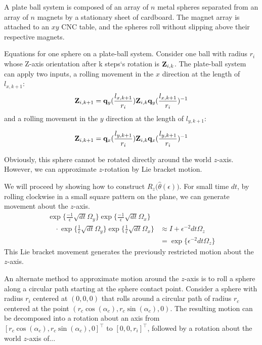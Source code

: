\documentclass[letter paper, 10pt, conference]{ieeeconf}
\begin{document}
A plate ball system is composed of an array of $n$ metal spheres separated from an array of $n$ magnets by a stationary sheet of cardboard.  The magnet array is attached to an $xy$ CNC table, and the spheres roll without slipping above their respective magnets.



Equations for one sphere on a plate-ball system.  Consider one ball with radius $r_i$ whose Z-axis orientation after k steps`s rotation is ${\bf Z}_{i,k}$.  The plate-ball system can apply two inputs, a rolling movement in the $x$ direction at the length of $l_{x,k+1}$:
\begin{align}
{\bf Z}_{i,k+1}={\bf q}_y(\frac{l_{x,k+1}}{r_i}){\bf Z}_{i,k}{\bf q}_y(\frac{l_{x,k+1}}{r_i})^{-1} \label{eq:PlateBallXrotation}
\end{align}
 and a rolling movement in the $y$ direction at the length of $l_{y,k+1}$:


\begin{align}
{\bf Z}_{i,k+1}={\bf q}_x(\frac{l_{y,k+1}}{r_i}){\bf Z}_{i,k}{\bf q}_x(\frac{l_{y,k+1}}{r_i})^{-1} \label{eq:PlateBallYrotations}
\end{align}

Obviously, this sphere cannot be rotated directly around the world $z$-axis.  However, we can approximate $z$-rotation by Lie bracket motion.

We will proceed by showing how to construct $R_z\!\big(\hat\theta(\epsilon)\big)$.
For small time $dt$, by rolling clockwise in a small square pattern on the plane, we can generate movement about the $z$-axis.
\begin{align*}
\exp\{\frac{-1}{\epsilon} \sqrt{dt} \Omega_y\}
  		    \exp\{\frac{-1}{\epsilon} \sqrt{dt} \Omega_x\}&  \\
	\quad \cdot		     \exp\{\frac{1}{\epsilon} \sqrt{dt} \Omega_y\}  
		      \exp\{\frac{1}{\epsilon} \sqrt{dt} \Omega_x\} &\approx  I + \epsilon^{-2} dt \Omega_z\\
	  &=  \exp\{ \epsilon^{-2} dt  \Omega_z\}
	  \end{align*}
This Lie bracket movement generates the previously restricted motion about the $z$-axis.	    

An alternate method to approximate motion around the $z$-axis is to roll a sphere  along a circular path starting at the sphere contact point.
Consider a sphere with radius $r_i$ centered at $(0,0,0)$ that rolls around a circular path of radius $r_c$ centered at the point $ (r_c\cos(\alpha_c), r_c\sin(\alpha_c),0)$.  The resulting motion can be decomposed into a rotation about an axis from $[ r_c \cos(\alpha_c), r_c\sin(\alpha_c),0]^\top$ to $[ 0,0,r_i]^\top$, followed by a rotation about the world $z$-axis of...
\end{document}
